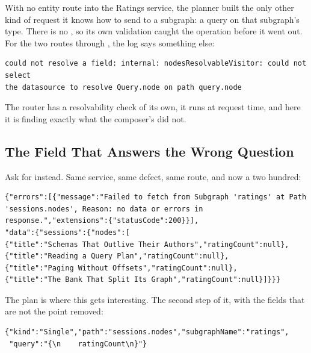 %
With no entity route into the Ratings service, the planner built the only other
kind of request it knows how to send to a subgraph: a query on that subgraph's
 type. There is no , so its own validation
caught the operation before it went out. For the two routes through
, the log says something else:

\begin{verbatim}
could not resolve a field: internal: nodesResolvableVisitor: could not select
the datasource to resolve Query.node on path query.node
\end{verbatim}

%
The router has a resolvability check of its own, it runs at request time, and
here it is finding exactly what the composer's did not.

\subsection{The Field That Answers the Wrong Question}

%
Ask for  instead. Same service, same defect, same route, and
now a two hundred:

\begin{verbatim}
{"errors":[{"message":"Failed to fetch from Subgraph 'ratings' at Path 'sessions.nodes', Reason: no data or errors in response.","extensions":{"statusCode":200}}],
"data":{"sessions":{"nodes":[
{"title":"Schemas That Outlive Their Authors","ratingCount":null},
{"title":"Reading a Query Plan","ratingCount":null},
{"title":"Paging Without Offsets","ratingCount":null},
{"title":"The Bank That Split Its Graph","ratingCount":null}]}}}
\end{verbatim}

%
The plan is where this gets interesting. The second step of it, with the
fields that are not the point removed:

\begin{verbatim}
{"kind":"Single","path":"sessions.nodes","subgraphName":"ratings",
 "query":"{\n    ratingCount\n}"}
\end{verbatim}

